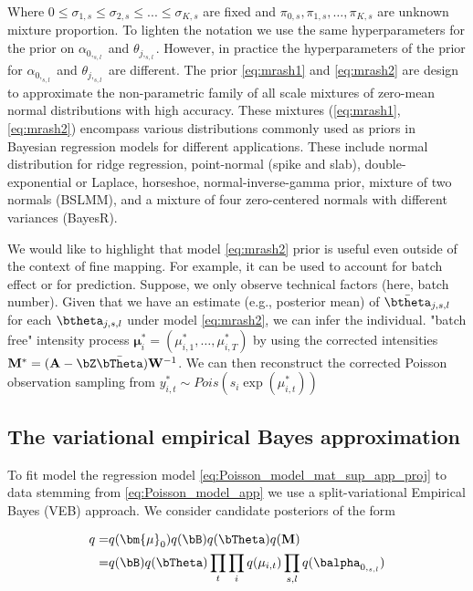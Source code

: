 Where $ 0 \leq\sigma_{1,s } \leq \sigma_{2,s } \leq ... \leq \sigma_{K,s }$ are fixed and $ \pi_{0,s}, \pi_{1,s}, \dots , \pi_{K,s}$ are   unknown mixture proportion. To lighten the notation we use the same hyperparameters for the prior on $ \alpha_{0,_{s,l}}$ and $ \theta_{j,_{s,l}}$. However, in practice the hyperparameters of the prior for  $ \alpha_{0,_{s,l}}$ and $ \theta_{j,_{s,l}}$ are different. The prior \ref{eq:mrash1} and \ref{eq:mrash2} are design to approximate the non-parametric family of all scale mixtures of zero-mean normal distributions with high accuracy. These    mixtures (\ref{eq:mrash1},\ref{eq:mrash2}) encompass various distributions commonly used as priors in Bayesian regression models for different applications. These include normal distribution for ridge regression, point-normal (spike and slab), double-exponential or Laplace, horseshoe, normal-inverse-gamma prior, mixture of two normals (BSLMM), and a mixture of four zero-centered normals with different variances (BayesR). 


We would like to highlight that model \ref{eq:mrash2}  prior is useful even outside of the context of fine mapping. For example, it can be used to account for batch effect or for prediction. Suppose, we only observe technical factors (here, batch number). Given that we have an estimate (e.g., posterior mean) of $\bar{\btheta}_{ j,{s,l}}$ for each $ \btheta_{j, {s,l}}$ under model \ref{eq:mrash2}, we can infer the individual.
  "batch free"  intensity process $\bm {\mu}_i ^*= (\mu_{i,1}^*,\ldots , \mu_{i,T}^*)$
by using the corrected intensities  
 $\mathbf{  M } ^* =   (\mathbf{  A } -\bZ \Bar{\bTheta} ) \mathbf{W}^{-1} $. We can then reconstruct the corrected Poisson observation  sampling from
 $  y_{i,t} ^* \sim Pois\!\left(s_i\exp(\mu_{i,t} ^*)\right)$


\subsection{The variational empirical Bayes approximation}

To fit model the regression model   \ref{eq:Poisson_model_mat_sup_app_proj}  to data stemming from \ref{eq:Poisson_model_app}   we use a split-variational Empirical Bayes (VEB) approach. 
We consider   candidate posteriors of the form

\begin{align}
    q=&q(\bm{\mu}_0)q( \bB)q( \bTheta ) q(\mathbf{  M }) \\
        =& q( \bB )q(\bTheta)  \prod_t\prod_i q( \mu_{i,t}) \prod_{s,l}q(\balpha_{0,_{s,l}})
\end{align}
 

